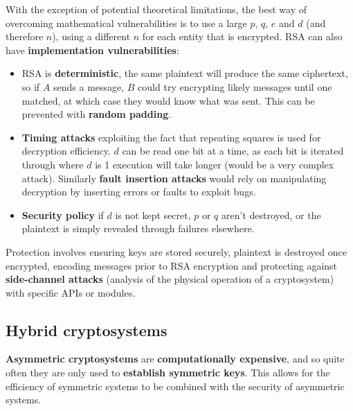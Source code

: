 \documentclass{article}
\begin{document}
With the exception of potential theoretical limitations, the best way of overcoming mathematical vulnerabilities is to use a large $ p $, $ q $, $ e $ and $ d $ (and therefore $ n $), using a different $ n $ for each entity that is encrypted. RSA can also have \textbf{implementation vulnerabilities}:
\begin{itemize}
	\item RSA is \textbf{deterministic}, the same plaintext will produce the same ciphertext, so if $ A $ sends a message, $ B $ could try encrypting likely messages until one matched, at which case they would know what was sent. This can be prevented with \textbf{random padding}.
	\item \textbf{Timing attacks} exploiting the fact that repeating squares is used for decryption efficiency. $ d $ can be read one bit at a time, as each bit is iterated through where $ d $ is 1 execution will take longer (would be a very complex attack). Similarly \textbf{fault insertion attacks} would rely on manipulating decryption by inserting errors or faults to exploit bugs.
	\item \textbf{Security policy} if $ d $ is not kept secret, $ p $ or $ q $ aren't destroyed, or the plaintext is simply revealed through failures elsewhere.
\end{itemize}
Protection involves ensuring keys are stored securely, plaintext is destroyed once encrypted, encoding messages prior to RSA encryption and protecting against \textbf{side-channel attacks} (analysis of the physical operation of a cryptosystem) with specific APIs or modules.

\subsection{Hybrid cryptosystems}
\textbf{Asymmetric cryptosystems} are \textbf{computationally expensive}, and so quite often they are only used to \textbf{establish symmetric keys}. This allows for the efficiency of symmetric systems to be combined with the security of asymmetric systems.
\end{document}
